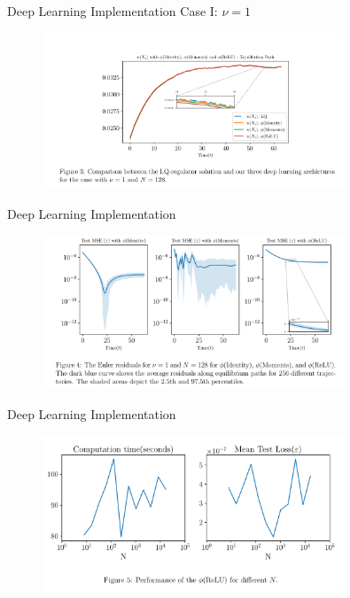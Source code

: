 \documentclass[dvipsnames,mathserif]{beamer}
\begin{document}
{\begin{frame}{Deep Learning Implementation}
Case I: $\nu = 1$
\begin{figure}[h!]
\centering
\includegraphics[width = 0.8\textwidth]{3.png}
\end{figure}
\end{frame}

\begin{frame}{Deep Learning Implementation}
\begin{figure}[h!]
\centering
\includegraphics[width = 0.8\textwidth]{4.png}
\end{figure}
\end{frame}

\begin{frame}{Deep Learning Implementation}
\begin{figure}[h!]
\centering
\includegraphics[width = 0.8\textwidth]{5.png}
\end{figure}
\end{frame}

}
\end{document}
